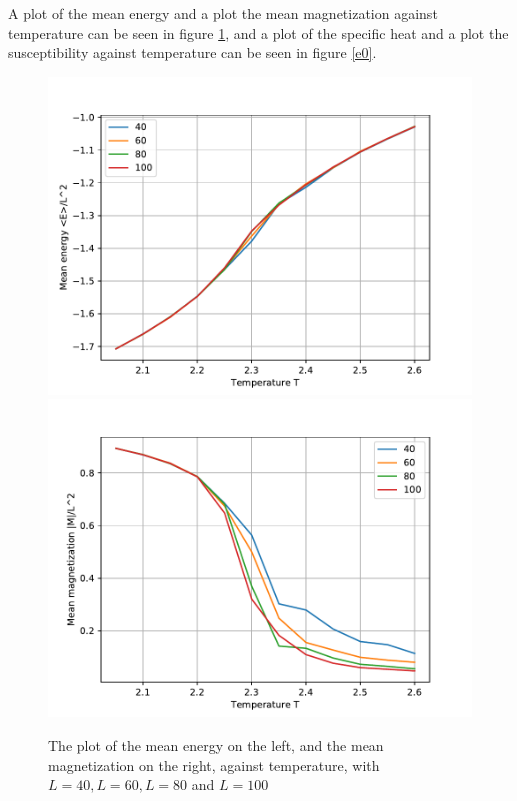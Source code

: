\documentclass[a4paper]{article}
\begin{document}
A plot of the mean energy and a plot the mean magnetization against temperature can be seen in figure \ref{e}, and a plot of the specific heat and a plot the susceptibility against temperature can be seen in figure \ref{e0}.

\begin{figure}[!htb]
	\centering 
	\includegraphics[scale=0.56]{../opp_e_me0.pdf}
	\includegraphics[scale=0.56]{../opp_e_mm0.pdf}
	\caption{The plot of the mean energy on the left, and the mean magnetization on the right, against temperature, with $L = 40, L = 60, L = 80$ and $L = 100$}
	\label{e}
\end{figure}
\end{document}
